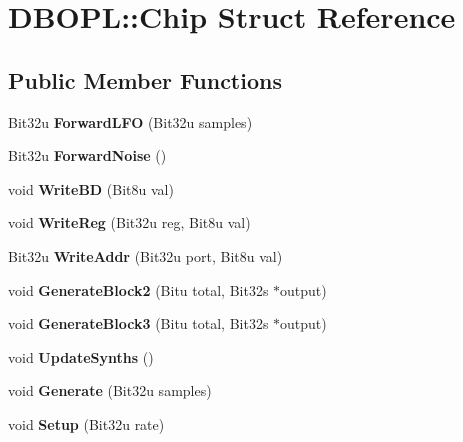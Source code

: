 \hypertarget{structDBOPL_1_1Chip}{\section{D\-B\-O\-P\-L\-:\-:Chip Struct Reference}
\label{structDBOPL_1_1Chip}
}
\subsection*{Public Member Functions}
\begin{DoxyCompactItemize}
\item 
\hypertarget{structDBOPL_1_1Chip_aa6fa687111a426a5f78e167fa257ab3c}{Bit32u {\bfseries Forward\-L\-F\-O} (Bit32u samples)}\label{structDBOPL_1_1Chip_aa6fa687111a426a5f78e167fa257ab3c}

\item 
\hypertarget{structDBOPL_1_1Chip_a24786d7a165991bee7de4fcc0d771b51}{Bit32u {\bfseries Forward\-Noise} ()}\label{structDBOPL_1_1Chip_a24786d7a165991bee7de4fcc0d771b51}

\item 
\hypertarget{structDBOPL_1_1Chip_a2860097b5662864a601a5e88366d830e}{void {\bfseries Write\-B\-D} (Bit8u val)}\label{structDBOPL_1_1Chip_a2860097b5662864a601a5e88366d830e}

\item 
\hypertarget{structDBOPL_1_1Chip_a91898e7f05d8dffc30731970a554ef7e}{void {\bfseries Write\-Reg} (Bit32u reg, Bit8u val)}\label{structDBOPL_1_1Chip_a91898e7f05d8dffc30731970a554ef7e}

\item 
\hypertarget{structDBOPL_1_1Chip_ab7a01561768354f16b8851a0d21b7a2c}{Bit32u {\bfseries Write\-Addr} (Bit32u port, Bit8u val)}\label{structDBOPL_1_1Chip_ab7a01561768354f16b8851a0d21b7a2c}

\item 
\hypertarget{structDBOPL_1_1Chip_a638ee66303a2716dcbe88b16152a9c4c}{void {\bfseries Generate\-Block2} (Bitu total, Bit32s $\ast$output)}\label{structDBOPL_1_1Chip_a638ee66303a2716dcbe88b16152a9c4c}

\item 
\hypertarget{structDBOPL_1_1Chip_a57226206980412fd2e0b8e56aa4df36a}{void {\bfseries Generate\-Block3} (Bitu total, Bit32s $\ast$output)}\label{structDBOPL_1_1Chip_a57226206980412fd2e0b8e56aa4df36a}

\item 
\hypertarget{structDBOPL_1_1Chip_a2de016e86cff2a981f5f6595bf5c159e}{void {\bfseries Update\-Synths} ()}\label{structDBOPL_1_1Chip_a2de016e86cff2a981f5f6595bf5c159e}

\item 
\hypertarget{structDBOPL_1_1Chip_aa5e8f70f9b01aba04e5f0c78e96414e8}{void {\bfseries Generate} (Bit32u samples)}\label{structDBOPL_1_1Chip_aa5e8f70f9b01aba04e5f0c78e96414e8}

\item 
\hypertarget{structDBOPL_1_1Chip_a4f8f64b35ed6b37939048323796996c1}{void {\bfseries Setup} (Bit32u rate)}\label{structDBOPL_1_1Chip_a4f8f64b35ed6b37939048323796996c1}

\end{DoxyCompactItemize}
